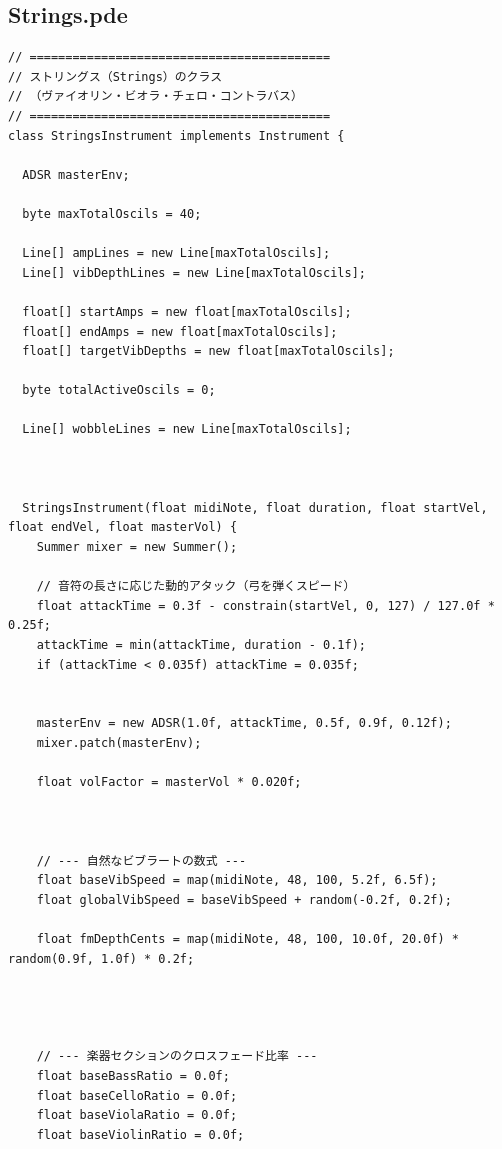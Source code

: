\subsection{Strings.pde}
\begin{lstlisting}[caption={Strings.pde}, label={lst:proc_strings}]
// ==========================================
// ストリングス（Strings）のクラス
// （ヴァイオリン・ビオラ・チェロ・コントラバス）
// ==========================================
class StringsInstrument implements Instrument {
  
  ADSR masterEnv; 
  
  byte maxTotalOscils = 40;
  
  Line[] ampLines = new Line[maxTotalOscils];
  Line[] vibDepthLines = new Line[maxTotalOscils];
  
  float[] startAmps = new float[maxTotalOscils];
  float[] endAmps = new float[maxTotalOscils];
  float[] targetVibDepths = new float[maxTotalOscils];
  
  byte totalActiveOscils = 0;
  
  Line[] wobbleLines = new Line[maxTotalOscils];
  
  
  
  StringsInstrument(float midiNote, float duration, float startVel, float endVel, float masterVol) {
    Summer mixer = new Summer();
    
    // 音符の長さに応じた動的アタック（弓を弾くスピード）
    float attackTime = 0.3f - constrain(startVel, 0, 127) / 127.0f * 0.25f;
    attackTime = min(attackTime, duration - 0.1f);
    if (attackTime < 0.035f) attackTime = 0.035f;
    
    
    masterEnv = new ADSR(1.0f, attackTime, 0.5f, 0.9f, 0.12f);
    mixer.patch(masterEnv); 
    
    float volFactor = masterVol * 0.020f; 
    
    
    
    // --- 自然なビブラートの数式 ---
    float baseVibSpeed = map(midiNote, 48, 100, 5.2f, 6.5f);
    float globalVibSpeed = baseVibSpeed + random(-0.2f, 0.2f);
    
    float fmDepthCents = map(midiNote, 48, 100, 10.0f, 20.0f) * random(0.9f, 1.0f) * 0.2f;
    
    
    
    
    // --- 楽器セクションのクロスフェード比率 ---
    float baseBassRatio = 0.0f;
    float baseCelloRatio = 0.0f;
    float baseViolaRatio = 0.0f;
    float baseViolinRatio = 0.0f;
    

\end{lstlisting}

